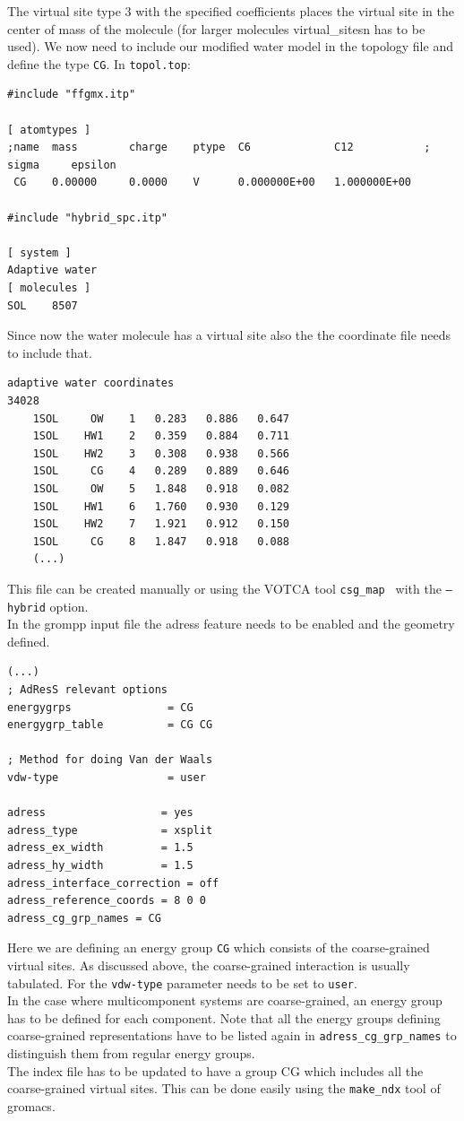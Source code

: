 The virtual site type 3 with the specified coefficients places the virtual site in the center of mass of the molecule (for larger molecules virtual_sitesn has to be used).
We now need to include our modified water model in the topology file and define the type {\tt CG}. In {\tt topol.top}:
{\small
\begin{verbatim}
#include "ffgmx.itp"

[ atomtypes ]
;name  mass        charge    ptype  C6             C12           ; sigma     epsilon
 CG    0.00000     0.0000    V      0.000000E+00   1.000000E+00

#include "hybrid_spc.itp"

[ system ]
Adaptive water
[ molecules ]
SOL    8507
\end{verbatim}}
Since now the water molecule has a virtual site also the the coordinate file needs to include that.
{\small
\begin{verbatim}
adaptive water coordinates
34028
    1SOL     OW    1   0.283   0.886   0.647
    1SOL    HW1    2   0.359   0.884   0.711
    1SOL    HW2    3   0.308   0.938   0.566
    1SOL     CG    4   0.289   0.889   0.646
    1SOL     OW    5   1.848   0.918   0.082
    1SOL    HW1    6   1.760   0.930   0.129
    1SOL    HW2    7   1.921   0.912   0.150
    1SOL     CG    8   1.847   0.918   0.088
    (...)
\end{verbatim}}
This file can be created manually or using the VOTCA tool {\tt csg_map } with the {\tt --hybrid} option.\\
In the grompp input file the adress feature needs to be enabled and the geometry defined.
{\small
\begin{verbatim}
(...)
; AdResS relevant options
energygrps               = CG
energygrp_table          = CG CG

; Method for doing Van der Waals
vdw-type                 = user

adress                  = yes
adress_type             = xsplit
adress_ex_width         = 1.5
adress_hy_width         = 1.5
adress_interface_correction = off
adress_reference_coords = 8 0 0
adress_cg_grp_names = CG
\end{verbatim}}

Here we are defining an energy group {\tt CG} which consists of the coarse-grained virtual sites.
As discussed above, the coarse-grained interaction is usually tabulated. For the {\tt vdw-type} parameter needs to be set to {\tt user}.\\
In the case where multicomponent systems are coarse-grained, an energy group has to be defined for each component. Note that all the energy groups defining coarse-grained representations have to be listed again in {\tt adress_cg_grp_names} to distinguish them from regular energy groups.\\
The index file has to be updated to have a group CG which includes all the coarse-grained virtual sites. This can be done easily using the {\tt make_ndx} tool of gromacs.

